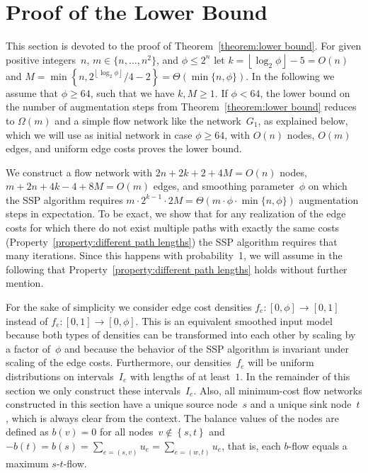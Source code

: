 \documentclass[11pt]{article}
\newcommand{\SET}[1]{\left\{#1\right\}}
\newcommand{\sSET}[1]{\{#1\}}
\newcommand{\floor}[1]{\left\lfloor#1\right\rfloor}
\begin{document}
\section{Proof of the Lower Bound}
\label{sec:lower bound}





This section is devoted to the proof of Theorem~\ref{theorem:lower bound}. For
given positive integers~$n$, $m \in \sSET{ n, \ldots, n^2 }$, and $\phi \le 2^n$
let $k = \floor{\log_2 \phi} - 5 = O(n)$ and $M = \min \SET{ n,
2^{\floor{\log_2 \phi}}/4-2 } = \Theta(\min \sSET{ n, \phi })$. In the following we assume that $\phi \geq 64$, such that we have $k,M \geq 1$. If $\phi<64$, the lower bound on the number of augmentation steps from Theorem~\ref{theorem:lower bound} reduces to $\Omega(m)$ and a simple flow network like the network~$G_1$, as explained below, which we will use as initial network in case $\phi \geq 64$, with $O(n)$ nodes, $O(m)$ edges, and uniform edge costs proves the lower bound.  

We construct a flow
network with $2n+2k+2+4M = O(n)$ nodes, $m+2n+4k-4+8M = O(m)$ edges, 
and smoothing parameter~$\phi$ on
which the SSP algorithm requires $m \cdot 2^{k-1} \cdot 2M = \Theta(m \cdot
\phi \cdot \min \sSET{ n, \phi })$ augmentation steps in expectation. To be
exact, we show that for any realization of the edge costs 
for which there do not exist multiple paths with exactly the same costs (Property~\ref{property:different path lengths}) 
the SSP algorithm requires that many iterations. Since this happens with probability~1,
we will assume in the following that Property~\ref{property:different path lengths} 
holds without further mention. 

For the sake of simplicity we consider edge cost densities $f_e \colon [0, \phi]
\to [0, 1]$ instead of $f_e \colon [0, 1] \to [0, \phi]$. This is an equivalent
smoothed input model because both types of densities can be transformed into
each other by scaling by a factor of~$\phi$ and because the behavior of the SSP
algorithm is invariant under scaling of the edge costs. Furthermore, our
densities~$f_e$ will be uniform distributions on intervals~$I_e$ with lengths of
at least~$1$. In the remainder of this section we only construct these
intervals~$I_e$. Also, all minimum-cost flow networks constructed in this
section have a unique source node~$s$ and a unique sink node~$t$, which is
always clear from the context. The balance values of the nodes are defined as
$b(v) = 0$ for all nodes~$v \notin \SET{ s, t }$ and $-b(t) = b(s) = \sum_{e =
(s, v)} u_e = \sum_{e = (w, t)} u_e$, that is, each $b$-flow equals a maximum
$s$-$t$-flow.
\end{document}
